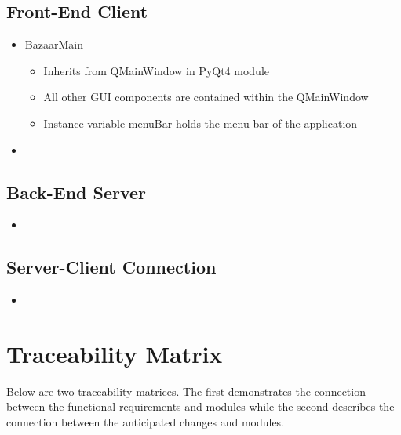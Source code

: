 \documentclass{article}
\begin{document}
\subsection*{Front-End Client}
\begin{itemize}
\item
BazaarMain

\begin{itemize}
\item
Inherits from QMainWindow in PyQt4 module

\item
All other GUI components are contained within the QMainWindow

\item
Instance variable menuBar holds the menu bar of the application
\end{itemize}

\item
\end{itemize}


\subsection*{Back-End Server}
\begin{itemize}
\item

\end{itemize}

\subsection*{Server-Client Connection}
\begin{itemize}
\item

\end{itemize}

\section*{Traceability Matrix}

Below are two traceability matrices. The first demonstrates the connection between the functional requirements and modules while the second describes the connection between the anticipated changes and modules.
\end{document}
